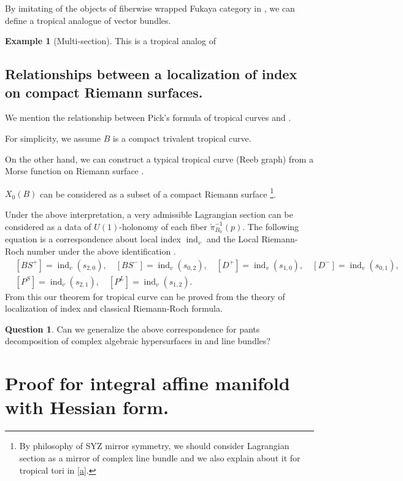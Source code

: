 \documentclass[a4paper,dvipdfmx,reqno,12pt]{amsart}
\theoremstyle{definition}
\newtheorem{Eg}[Thm]{Example}
\newtheorem{Ques}[Thm]{Question}
\newcommand{\opn}[1]{\operatorname{#1}}
\numberwithin{equation}{section}
\begin{document}
By imitating of the objects of fiberwise wrapped Fukaya category 
in \cite{auroux2022lagrangian}, we can define a tropical 
analogue of vector bundles.
\begin{Eg}[{Multi-section}]

This is a tropical analog of 
\end{Eg}

\subsection{Relationships between a localization of 
index on compact Riemann surfaces.}

We mention the relationship between Pick's formula of tropical curves and
\cite[6]{MR2676658}.

For simplicity, we assume $B$ is a compact trivalent tropical curve.

On the other hand, we can construct a typical tropical curve
(Reeb graph) from a Morse function on Riemann surface
\cite[3.2.2]{kontsevichAffineStructuresNonArchimedean2006a}.

$X_0(B)$  can be considered as a subset of a compact Riemann surface
\footnote{By philosophy of SYZ mirror symmetry,
  we should consider Lagrangian section as a mirror of complex line bundle
  and we also explain about it for tropical tori in \cref{a}.
}.

Under the above interpretation, a very admissible Lagrangian section can be considered as a data of $U(1)$-holonomy of each fiber $\check{\pi}_{B_0}^{-1}(p)$.
The following equation is a correspondence about local index $\opn{ind}_v$ and the Local Riemann-Roch number under the above identification \cite[Theorem 6.7]{MR2676658}.
\begin{align}
   & [BS^{+}]=\opn{ind}_v(s_{2,0}),
  \quad [BS^{-}]=\opn{ind}_v(s_{0,2}),
  \quad [D^{+}]=\opn{ind}_v(s_{1,0}),
  \quad [D^{-}]=\opn{ind}_v(s_{0,1}), \\
   & [P^{S}]=\opn{ind}_v(s_{2,1}),
  \quad [P^{L}]=\opn{ind}_v(s_{1,2}).
\end{align}
From this our theorem for tropical curve can be proved from the theory of localization of index and classical Riemann-Roch formula.
\begin{Ques}
  Can we generalize the above correspondence for pants decomposition of
  complex algebraic hypersurfaces in \cite{MR2079993} and line bundles?
\end{Ques}

\section{Proof for integral affine manifold with Hessian form.}
\end{document}
